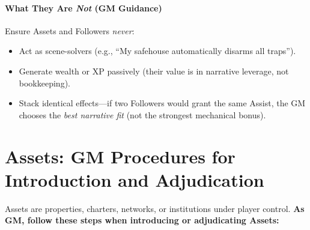 \paragraph{What They Are \emph{Not} (GM Guidance)}
Ensure Assets and Followers \emph{never}:  
\begin{itemize}
  \item Act as scene-solvers (e.g., ``My safehouse automatically disarms all traps'').  
  \item Generate wealth or XP passively (their value is in narrative leverage, not bookkeeping).  
  \item Stack identical effects---if two Followers would grant the same Assist, the GM chooses the \emph{best narrative fit} (not the strongest mechanical bonus).  
\end{itemize}

\section{Assets: GM Procedures for Introduction and Adjudication}
\label{sec:gm-assets-procedures}
Assets are properties, charters, networks, or institutions under player control. \textbf{As GM, follow these steps when introducing or adjudicating Assets:}  

